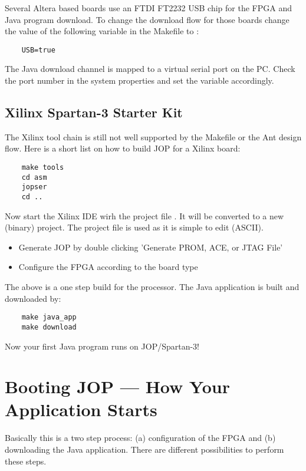 Several Altera based boards use an FTDI FT2232 USB chip for the FPGA
and Java program download. To change the download flow for those
boards change the value of the following variable in the Makefile to
:

\begin{lstlisting}
    USB=true
\end{lstlisting}

The Java download channel is mapped to a virtual serial port on the
PC. Check the port number in the system properties and set the
variable  accordingly.

\subsection{Xilinx Spartan-3 Starter Kit}

 The Xilinx tool chain is still not well supported by
the Makefile or the Ant design flow. Here is a short list on how to
build JOP for a Xilinx board:

\begin{lstlisting}
    make tools
    cd asm
    jopser
    cd ..
\end{lstlisting}


Now start the Xilinx IDE wirh the project file . It
will be converted to a new (binary)  project. The
 project file is used as it is simple to edit (ASCII).

\begin{itemize}
    \item Generate JOP by double clicking 'Generate PROM, ACE, or JTAG File'
    \item Configure the FPGA according to the board type
\end{itemize}

The above is a one step build for the processor. The Java
application is built and downloaded by:

\begin{lstlisting}
    make java_app
    make download
\end{lstlisting}

Now your first Java program runs on JOP/Spartan-3!

\section{Booting JOP --- How Your Application Starts}

Basically this is a two step process: (a) configuration of the FPGA
and (b) downloading the Java application. There are different
possibilities to perform these steps.

